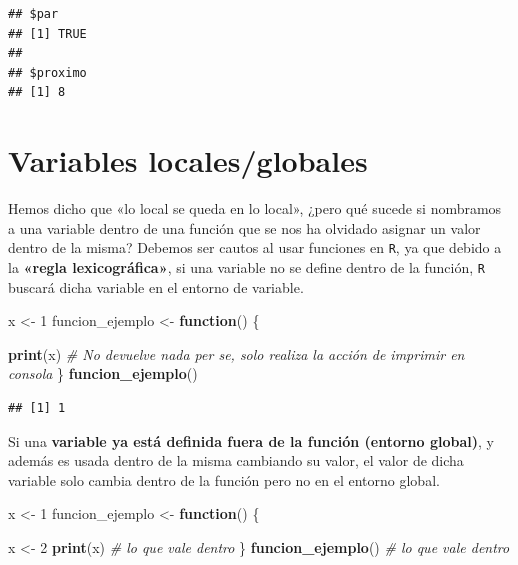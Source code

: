 \documentclass[11pt,]{book}
\newenvironment{Shaded}{\begin{snugshade}}{\end{snugshade}}
\newcommand{\CommentTok}[1]{\textcolor[rgb]{0.37,0.37,0.37}{\textit{#1}}}
\newcommand{\ControlFlowTok}[1]{\textcolor[rgb]{0.27,0.27,0.27}{\textbf{#1}}}
\newcommand{\DecValTok}[1]{\textcolor[rgb]{0.06,0.06,0.06}{#1}}
\newcommand{\KeywordTok}[1]{\textcolor[rgb]{0.27,0.27,0.27}{\textbf{#1}}}
\newcommand{\NormalTok}[1]{#1}
\newcommand{\StringTok}[1]{\textcolor[rgb]{0.5,0.5,0.5}{#1}}
\begin{document}
\begin{verbatim}
## $par
## [1] TRUE
## 
## $proximo
## [1] 8
\end{verbatim}

\hypertarget{variables-localesglobales}{%
\section{Variables locales/globales}\label{variables-localesglobales}}

Hemos dicho que «lo local se queda en lo local», ¿pero qué sucede si nombramos a una variable dentro de una función que se nos ha olvidado asignar un valor dentro de la misma? Debemos ser cautos al usar funciones en \texttt{R}, ya que debido a la \textbf{«regla lexicográfica»}, si una variable no se define dentro de la función, \texttt{R} buscará dicha variable en el entorno de variable.

\begin{Shaded}
\begin{Highlighting}[]
\NormalTok{x <-}\StringTok{ }\DecValTok{1}
\NormalTok{funcion_ejemplo <-}\StringTok{ }\ControlFlowTok{function}\NormalTok{() \{}
    
  \KeywordTok{print}\NormalTok{(x) }\CommentTok{# No devuelve nada per se, solo realiza la acción de imprimir en consola}
\NormalTok{\}}
\KeywordTok{funcion_ejemplo}\NormalTok{()}
\end{Highlighting}
\end{Shaded}

\begin{verbatim}
## [1] 1
\end{verbatim}

Si una \textbf{variable ya está definida fuera de la función (entorno global)}, y además es usada dentro de la misma cambiando su valor, el valor de dicha variable solo cambia dentro de la función pero no en el entorno global.

\begin{Shaded}
\begin{Highlighting}[]
\NormalTok{x <-}\StringTok{ }\DecValTok{1}
\NormalTok{funcion_ejemplo <-}\StringTok{ }\ControlFlowTok{function}\NormalTok{() \{}
    
\NormalTok{  x <-}\StringTok{ }\DecValTok{2}
  \KeywordTok{print}\NormalTok{(x) }\CommentTok{# lo que vale dentro}
\NormalTok{\}}
\KeywordTok{funcion_ejemplo}\NormalTok{() }\CommentTok{# lo que vale dentro}
\end{Highlighting}
\end{Shaded}
\end{document}
